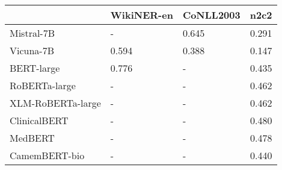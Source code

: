 \begin{tabular}{lllr}
\toprule
 & WikiNER-en & CoNLL2003 & n2c2 \\
\midrule
Mistral-7B & - & 0.645 & 0.291 \\
Vicuna-7B & 0.594 & 0.388 & 0.147 \\
BERT-large & 0.776 & - & 0.435 \\
RoBERTa-large & - & - & 0.462 \\
XLM-RoBERTa-large & - & - & 0.462 \\
ClinicalBERT & - & - & 0.480 \\
MedBERT & - & - & 0.478 \\
CamemBERT-bio & - & - & 0.440 \\
\bottomrule
\end{tabular}
